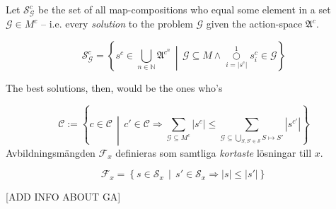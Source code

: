 \documentclass[10pt,a4paper]{article}
\begin{document}
Let \(\mathscr{S}^c_\mathcal{G}\) be the set of all map-compositions who equal some element in a set \(\mathcal{G}\in M^c\) -- i.e. every \textit{solution} to the problem \(\mathcal{G}\) given the action-space \(\mathfrak{A}^c\).

\begin{equation}
		\mathscr{S}^c_\mathcal{G} = \left\{ s^c \in \bigcup_{n\in \mathbb{N}}\mathfrak{A}^{c^n} \,\middle|\, \mathcal{G}\subseteq M\wedge\overset{1}{\underset{i=|s^c|}\bigcirc} s^c_i \in \mathcal{G} \right\}
\end{equation}


The best solutions, then, would be the ones who's 

\begin{equation}
		\mathscr{C} := \left\{ c \in \mathcal{C} \,\middle|\, c'\in\mathcal{C} \Rightarrow \sum_{\mathcal{G}\subseteq M^c} \left|s^{c}\right| \le \sum_{\mathcal{G}\subseteq \underset {S,S'\in\mathcal{S}} \bigcup S\mapsto S'} \left|s^{c'}\right| \right\}
\end{equation}
Avbildningsmängden \(\mathscr{F}_x\) definieras som samtliga \textit{kortaste} lösningar till \(x\).

\begin{equation}
		\mathscr{F}_x=\left\{s\in\mathscr{S}_x \,\middle|\, s'\in \mathscr{S}_x \Rightarrow |s|\le|s'|\right\}
\end{equation}

[ADD INFO ABOUT GA]
\end{document}
